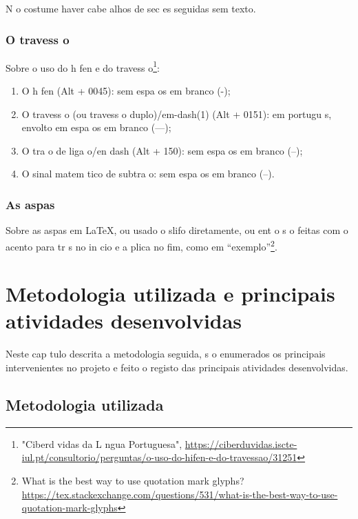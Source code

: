 \documentclass{article}
\begin{document}
\begin{info}
N o   costume haver cabe alhos de sec es seguidas sem texto.
\end{info}

\subsection*{O travess o}

Sobre o uso do h fen e do travess o\footnote{"Ciberd vidas da L ngua Portuguesa", \url{https://ciberduvidas.iscte-iul.pt/consultorio/perguntas/o-uso-do-hifen-e-do-travessao/31251}}: 
\begin{enumerate}
    \item O h fen (Alt + 0045): sem espa os em branco (-);
    \item O travess o (ou travess o duplo)/em-dash(1) (Alt + 0151): em portugu s, envolto em espa os em branco (---);
    \item O tra o de liga o/en dash (Alt + 150): sem espa os em branco (--);
    \item O sinal matem tico de subtra o: sem espa os em branco (--).
\end{enumerate}

\subsection*{As aspas}

Sobre as aspas  em \LaTeX, ou   usado o slifo diretamente, ou ent o s o feitas com o acento para tr s no in cio e a plica no fim, como em ``exemplo''\footnote{What is the best way to use quotation mark glyphs? 
\url{https://tex.stackexchange.com/questions/531/what-is-the-best-way-to-use-quotation-mark-glyphs}}.


\chapter{Metodologia utilizada e principais atividades desenvolvidas}\label{chap:metodo}

Neste cap tulo   descrita a metodologia seguida, s o enumerados os
principais intervenientes no projeto e   feito o registo das
principais atividades desenvolvidas.

\section{Metodologia utilizada}
\end{document}
